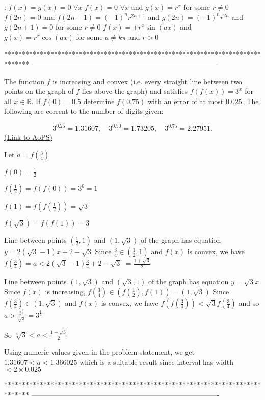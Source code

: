 \begin{solution}
 :
$f(x)=g(x)=0$ $\forall x$
$f(x)=0$ $\forall x$ and $g(x)=r^x$ for some $r\ne 0$
$f(2n)=0$ and $f(2n+1)=(-1)^nr^{2n+1}$ and $g(2n)=(-1)^nr^{2n}$ and $g(2n+1)=0$ for some $r\ne 0$
$f(x)=\pm r^x\sin(ax)$ and $g(x)=r^x\cos(ax)$ for some $a\ne k\pi$ and $r>0$
\end{solution}
*******************************************************************************
-------------------------------------------------------------------------------

\begin{problem}
	The function $f$ is increasing and convex (i.e. every straight line between two points on the graph of $f$ lies above the graph) and satisfies $f(f(x))=3^x$ for all $x\in\mathbb{R}$. If $f(0)=0.5$ determine $f(0.75)$ with an error of at most $0.025$. The following are corrent to the number of digits given:

\[3^{0.25}=1.31607,\quad 3^{0.50}=1.73205,\quad 3^{0.75}=2.27951.\]
	\flushright \href{https://artofproblemsolving.com/community/c6h481391}{(Link to AoPS)}
\end{problem}



\begin{solution}
	Let $a=f(\frac 34)$

$f(0)=\frac 12$

$f(\frac 12)=f(f(0))=3^0=1$

$f(1)=f(f(\frac 12))=\sqrt 3$

$f(\sqrt 3)=f(f(1))=3$

Line between points $(\frac 12,1)$ and $(1,\sqrt 3)$ of the graph has equation $y=2(\sqrt 3-1)x+2-\sqrt 3$
Since $\frac 34\in(\frac 12,1)$ and $f(x)$ is convex, we have $f(\frac 34)=a<2(\sqrt 3-1)\frac 34+2-\sqrt 3$ $=\frac{1+\sqrt 3}2$

Line between points $(1,\sqrt 3)$ and $(\sqrt 3,1)$ of the graph has equation $y=\sqrt 3x$
Since $f(x)$ is increasing, $f(\frac 34)\in(f(\frac 12),f(1))=(1,\sqrt 3)$
Since $f(\frac 34)\in(1,\sqrt 3)$ and $f(x)$ is convex, we have $f(f(\frac 34))<\sqrt 3f(\frac 34)$ and so $a>\frac{3^{\frac 34}}{\sqrt 3}=3^{\frac 14}$

So $\sqrt[4]3<a<\frac{1+\sqrt 3}2$

Using numeric values given in the problem statement, we get $\boxed{1.31607<a<1.366025}$ which is a suitable result since interval has width $<2\times 0.025$
\end{solution}
*******************************************************************************
-------------------------------------------------------------------------------

